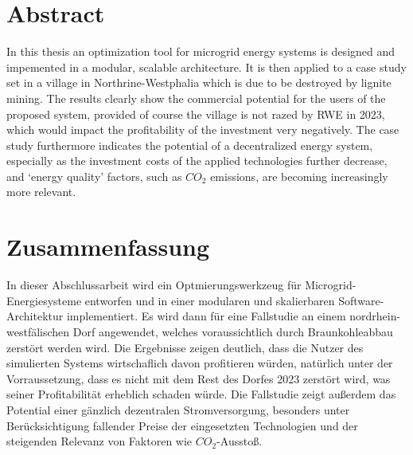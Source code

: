 \documentclass[
	11pt,								%
	DIV10,								%
	a4paper,         					%
	oneside,							%
	headheight=20pt,					%
	footheight=20pt,					%
    parskip=full,						%
    listof=totoc,						%
	bibliography=totoc,					%
	index=totoc,						%
]{scrartcl}
\begin{document}
	\newpage


	\section*{Abstract}
	
	In this thesis an optimization tool for microgrid energy systems is designed and impemented in a modular, scalable architecture. It is then applied to a case study set in a village in Northrine-Westphalia which is due to be destroyed by lignite mining. The results clearly show the commercial potential for the users of the proposed system, provided of course the village is not razed by RWE in 2023, which would impact the profitability of the investment very negatively. The case study furthermore indicates the potential of a decentralized energy system, especially as the investment costs of the applied technologies further decrease, and `energy quality' factors, such as $CO_2$ emissions, are becoming increasingly more relevant.
	
	\section*{Zusammenfassung}
	
	In dieser Abschlussarbeit wird ein Optmierungswerkzeug für Microgrid-Energiesysteme entworfen und in einer modularen und skalierbaren Software-Architektur implementiert. Es wird dann für eine Fallstudie an einem nordrhein-westfälischen Dorf angewendet, welches voraussichtlich durch Braunkohleabbau zerstört werden wird. Die Ergebnisse zeigen deutlich, dass die Nutzer des simulierten Systems wirtschaflich davon profitieren würden, natürlich unter der Vorraussetzung, dass es nicht mit dem Rest des Dorfes 2023 zerstört wird, was seiner Profitabilität erheblich schaden würde. Die Fallstudie zeigt außerdem das Potential einer gänzlich dezentralen Stromversorgung, besonders unter Berücksichtigung fallender Preise der eingesetzten Technologien und der steigenden Relevanz von Faktoren wie $CO_2$-Ausstoß.
	
	
		\newpage	

	
\end{document}
